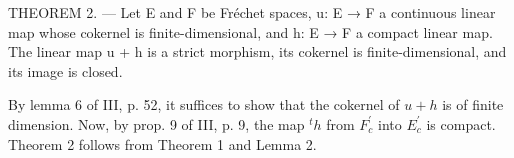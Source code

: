 THEOREM 2. --- Let E and F be Fréchet spaces, u: E → F a continuous linear map whose cokernel is finite-dimensional, and h: E → F a compact linear map. The linear map u + h is a strict morphism, its cokernel is finite-dimensional, and its image is closed.

By lemma 6 of III, p. 52, it suffices to show that the cokernel of \(u + h\) is of finite dimension. Now, by prop. 9 of III, p. 9, the map \(^{t}h\) from \(F_{c}^{\prime}\) into \(E_{c}^{\prime}\) is compact. Theorem 2 follows from Theorem 1 and Lemma 2.

